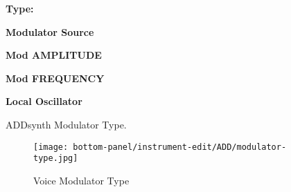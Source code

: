    \begin{enumber}
      \item \textbf{Type:}
      \item \textbf{Modulator Source}
      \item \textbf{Mod AMPLITUDE}
      \item \textbf{Mod FREQUENCY}
      \item \textbf{Local Oscillator}
   \end{enumber}

   \setcounter{ItemCounter}{0}      %

   ADDsynth Modulator Type.

\begin{figure}[H]
   \centering
   \texttt{[image: bottom-panel/instrument-edit/ADD/modulator-type.jpg]}
   \caption{Voice Modulator Type}
   \label{fig:voice_modulator_type}
\end{figure}

